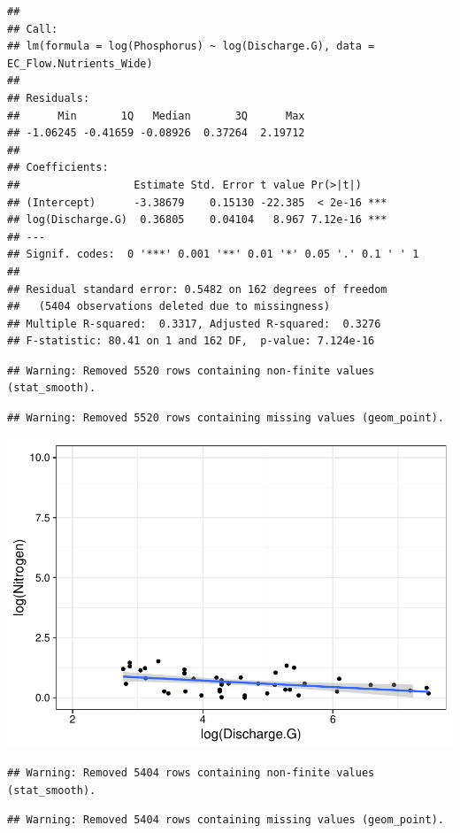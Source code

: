 \documentclass[12pt,]{article}
\begin{document}
\begin{verbatim}
## 
## Call:
## lm(formula = log(Phosphorus) ~ log(Discharge.G), data = EC_Flow.Nutrients_Wide)
## 
## Residuals:
##      Min       1Q   Median       3Q      Max 
## -1.06245 -0.41659 -0.08926  0.37264  2.19712 
## 
## Coefficients:
##                  Estimate Std. Error t value Pr(>|t|)    
## (Intercept)      -3.38679    0.15130 -22.385  < 2e-16 ***
## log(Discharge.G)  0.36805    0.04104   8.967 7.12e-16 ***
## ---
## Signif. codes:  0 '***' 0.001 '**' 0.01 '*' 0.05 '.' 0.1 ' ' 1
## 
## Residual standard error: 0.5482 on 162 degrees of freedom
##   (5404 observations deleted due to missingness)
## Multiple R-squared:  0.3317, Adjusted R-squared:  0.3276 
## F-statistic: 80.41 on 1 and 162 DF,  p-value: 7.124e-16
\end{verbatim}

\begin{verbatim}
## Warning: Removed 5520 rows containing non-finite values (stat_smooth).
\end{verbatim}

\begin{verbatim}
## Warning: Removed 5520 rows containing missing values (geom_point).
\end{verbatim}

\includegraphics{Landman_ENV872_Project_files/figure-latex/unnamed-chunk-9-1.pdf}

\begin{verbatim}
## Warning: Removed 5404 rows containing non-finite values (stat_smooth).
\end{verbatim}

\begin{verbatim}
## Warning: Removed 5404 rows containing missing values (geom_point).
\end{verbatim}
\end{document}
